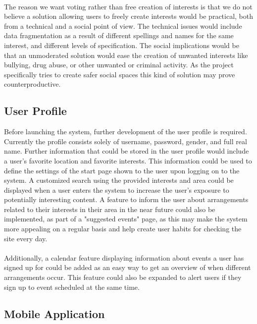 \paragraph{} The reason we want voting rather than free creation of interests is that we do not believe a solution allowing users to freely create interests would be practical, both from a technical and a social point of view. The technical issues would include data fragmentation as a result of different spellings and names for the same interest, and different levels of specification. The social implications would be that an unmoderated solution  would ease the creation of unwanted interests like bullying, drug abuse, or other unwanted or criminal activity. As the project specifically tries to create safer social spaces this kind of solution may prove counterproductive.

\subsection{User Profile}
\label{subsec:FurtherRequiredUser}

Before launching the system, further development of the user profile is required. Currently the profile consists solely of username, password, gender, and full real name. Further information that could be stored in the user profile would include a user's favorite location and favorite interests. This information could be used to define the settings of the start page shown to the user upon logging on to the system. A customized search using the provided interests and area could be displayed when a user enters the system to increase the user's exposure to potentially interesting content. A feature to inform the user about arrangements related to their interests in their area in the near future could also be implemented, as part of a "suggested events" page, as this may make the system more appealing on a regular basis and help create user habits for checking the site every day.
\paragraph{} Additionally, a calendar feature displaying information about events a user has signed up for could be added as an easy way to get an overview of when different arrangements occur. This feature could also be expanded to alert users if they sign up to event scheduled at the same time.

\subsection{Mobile Application}
\label{subsec:FurtherRequiredMobile}

